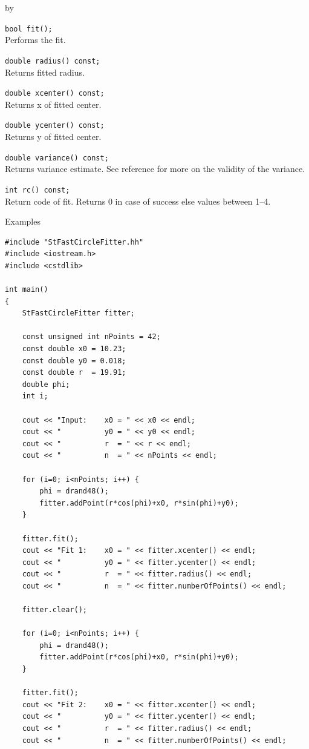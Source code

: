 \documentclass[twoside]{article}
\newcommand{\entrylabel}[1]{\mbox{\textbf{{#1}}}\hfil}%
\newenvironment{entry}
{\begin{list}{}%
    {\renewcommand{\makelabel}{\entrylabel}%
     \setlength{\labelwidth}{90pt}%
     \setlength{\leftmargin}{\labelwidth}
     \advance\leftmargin by \labelsep%
      }%
    }%
  {\end{list}}
\newcommand{\Entrylabel}[1]%
{\raisebox{0pt}[1ex][0pt]{\makebox[\labelwidth][l]%
    {\parbox[t]{\labelwidth}{\hspace{0pt}\textbf{{#1}}}}}}
\newenvironment{Entry}%
{\renewcommand{\entrylabel}{\Entrylabel}\begin{entry}}%
  {\end{entry}}
\begin{document}
\begin{description}
\begin{Entry}
    \verb+bool fit();+\\
    Performs the fit.
    
    \verb+double radius() const;+\\
    Returns fitted radius.
    
    \verb+double xcenter() const;+\\
    Returns x of fitted center.
    
    \verb+double ycenter() const;+\\
    Returns y of fitted center.
    
    \verb+double variance() const;+\\
    Returns variance estimate.
    See reference for more on the validity of the variance.
    
    \verb+int rc() const;+\\
    Return code of fit. Returns 0 in case of success
    else values between 1--4.
  
\item[Examples]
{\footnotesize
\begin{verbatim}
#include "StFastCircleFitter.hh"
#include <iostream.h>
#include <cstdlib>

int main()
{
    StFastCircleFitter fitter;

    const unsigned int nPoints = 42;
    const double x0 = 10.23;
    const double y0 = 0.018;
    const double r  = 19.91;
    double phi;
    int i;

    cout << "Input:    x0 = " << x0 << endl;
    cout << "          y0 = " << y0 << endl;
    cout << "          r  = " << r << endl;
    cout << "          n  = " << nPoints << endl;
    
    for (i=0; i<nPoints; i++) {
        phi = drand48();
        fitter.addPoint(r*cos(phi)+x0, r*sin(phi)+y0);
    }

    fitter.fit();
    cout << "Fit 1:    x0 = " << fitter.xcenter() << endl;
    cout << "          y0 = " << fitter.ycenter() << endl;
    cout << "          r  = " << fitter.radius() << endl;
    cout << "          n  = " << fitter.numberOfPoints() << endl;

    fitter.clear();
    
    for (i=0; i<nPoints; i++) {
        phi = drand48();
        fitter.addPoint(r*cos(phi)+x0, r*sin(phi)+y0);
    }

    fitter.fit();
    cout << "Fit 2:    x0 = " << fitter.xcenter() << endl;
    cout << "          y0 = " << fitter.ycenter() << endl;
    cout << "          r  = " << fitter.radius() << endl;
    cout << "          n  = " << fitter.numberOfPoints() << endl;


\end{verbatim}}
\end{Entry}
\end{description}
\end{document}
